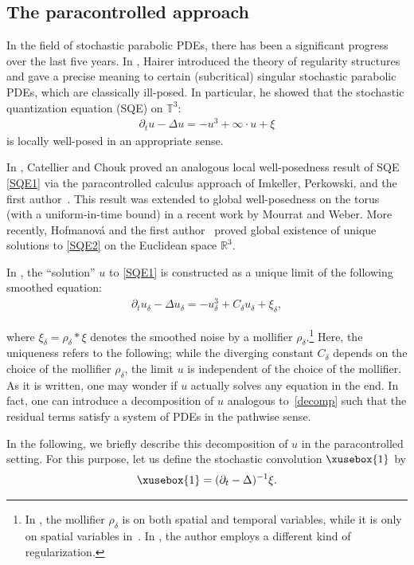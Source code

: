 \documentclass[%
11pt,  reqno]{amsart}
\def\<#1>{\xusebox{#1}}
\newcommand{\1}{\hspace{0.2mm}\text{I}\hspace{0.2mm}}
\newcommand{\noi}{\noindent}
\newcommand{\R}{\mathbb{R}}
\newcommand{\T}{\mathbb{T}}
\newcommand{\dl}{\delta}
\newcommand{\Dl}{\Delta}
\newcommand{\dt}{\partial_t}
\numberwithin{equation}{section}
\numberwithin{theorem}{section}
\begin{document}
\subsection{The paracontrolled approach}
In the field of stochastic parabolic PDEs, 
there has been a significant progress
over the last five years.
In \cite{Hairer}, Hairer introduced the theory of regularity structures
and gave a precise meaning to 
certain (subcritical) singular stochastic parabolic PDEs,
which are classically ill-posed.
In particular, he showed that the stochastic quantization equation (SQE) on $\T^3$:
\begin{align}
\dt u -  \Dl u  = - u^3 + \infty \cdot u  + \xi
\label{SQE1}
\end{align}
\noi
is locally well-posed in an appropriate sense.

In \cite{CC}, Catellier and Chouk
proved an analogous local well-posedness result of SQE \eqref{SQE1} 
via the paracontrolled calculus approach of Imkeller, Perkowski,  and the first author~\cite{GIP}.
This result was extended to global well-posedness on the torus
(with a uniform-in-time bound) 
in a recent work \cite{MW1}
by Mourrat and Weber. 
More recently,  Hofmanov\'a and the first author~\cite{GH18} 
proved global  existence of unique solutions to \eqref{SQE2} on the Euclidean space $\R^3$.

In \cite{Hairer, CC}, 
the ``solution'' $u$ to \eqref{SQE1}
is constructed as a unique limit
of the following smoothed equation:
\begin{align}
\dt u_\dl -  \Dl u_\dl = - u_\dl^3 + C_\dl u_\dl  + \xi_\dl, 
\label{SQE2}
\end{align}

\noi
where $ \xi_\dl =  \rho_\dl * \xi$
denotes the smoothed noise
by a mollifier $\rho_\dl$.\footnote{In \cite{Hairer}, 
the mollifier $\rho_\dl$ is on both spatial and temporal variables, 
while it is only on spatial variables in~\cite{CC}.
In \cite{Kupi}, the author employs a different kind of regularization.}
Here, the uniqueness refers to the following;
while  the diverging constant $C_\dl$ depends
on the choice of the  mollifier $\rho_\dl$, 
the limit $u$ is independent of the choice of the mollifier.
As it is written, 
one may wonder if $u$ actually solves any equation in the end.
In fact, one can introduce a decomposition of $u$
analogous to~\eqref{decomp}
such that the residual terms satisfy a system
of PDEs in the pathwise sense.



In the following, we briefly describe this decomposition of $u$
in the paracontrolled setting.
For this purpose, let us define
the stochastic convolution 
$\<1>$  
by 
\begin{align*}
 \<1> = (\dt - \Dl)^{-1} \xi.
\end{align*}
\end{document}
